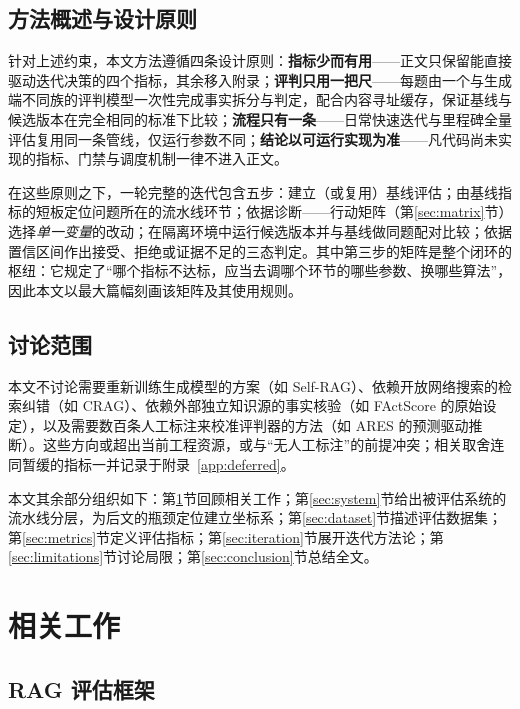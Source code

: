 \documentclass[11pt,a4paper,fontset=fandol]{ctexart}
\begin{document}
\subsection{方法概述与设计原则}

针对上述约束，本文方法遵循四条设计原则：\textbf{指标少而有用}——正文只保留能直接驱动迭代决策的四个指标，其余移入附录；\textbf{评判只用一把尺}——每题由一个与生成端不同族的评判模型一次性完成事实拆分与判定，配合内容寻址缓存，保证基线与候选版本在完全相同的标准下比较；\textbf{流程只有一条}——日常快速迭代与里程碑全量评估复用同一条管线，仅运行参数不同；\textbf{结论以可运行实现为准}——凡代码尚未实现的指标、门禁与调度机制一律不进入正文。

在这些原则之下，一轮完整的迭代包含五步：建立（或复用）基线评估；由基线指标的短板定位问题所在的流水线环节；依据诊断——行动矩阵（第\ref{sec:matrix}节）选择\emph{单一变量}的改动；在隔离环境中运行候选版本并与基线做同题配对比较；依据置信区间作出接受、拒绝或证据不足的三态判定。其中第三步的矩阵是整个闭环的枢纽：它规定了``哪个指标不达标，应当去调哪个环节的哪些参数、换哪些算法''，因此本文以最大篇幅刻画该矩阵及其使用规则。

\subsection{讨论范围}

本文不讨论需要重新训练生成模型的方案（如 Self-RAG\cite{selfrag}）、依赖开放网络搜索的检索纠错（如 CRAG\cite{crag}）、依赖外部独立知识源的事实核验（如 FActScore 的原始设定\cite{factscore}），以及需要数百条人工标注来校准评判器的方法（如 ARES 的预测驱动推断\cite{ares}）。这些方向或超出当前工程资源，或与``无人工标注''的前提冲突；相关取舍连同暂缓的指标一并记录于附录~\ref{app:deferred}。

本文其余部分组织如下：第\ref{sec:related}节回顾相关工作；第\ref{sec:system}节给出被评估系统的流水线分层，为后文的瓶颈定位建立坐标系；第\ref{sec:dataset}节描述评估数据集；第\ref{sec:metrics}节定义评估指标；第\ref{sec:iteration}节展开迭代方法论；第\ref{sec:limitations}节讨论局限；第\ref{sec:conclusion}节总结全文。

\section{相关工作}
\label{sec:related}

\subsection{RAG 评估框架}
\end{document}
